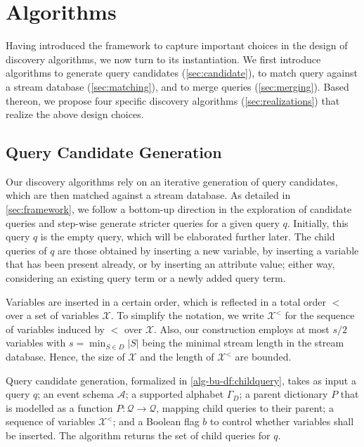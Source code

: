 

\section{\sys{} Algorithms}
\label{sec:algos}
Having introduced the \sys{} framework to capture important choices in the
design of discovery algorithms, we now turn to its instantiation. We
first introduce algorithms to generate query
candidates (\autoref{sec:candidate}), to match query against a stream
database (\autoref{sec:matching}), and to merge queries
(\autoref{sec:merging}). Based thereon, we propose four specific
discovery algorithms (\autoref{sec:realizations}) that realize the above
design choices.

\subsection{Query Candidate Generation}
\label{sec:candidate}



Our discovery algorithms rely on an iterative generation of query candidates,
which are then matched against a stream database. As detailed in
\autoref{sec:framework}, we follow a
bottom-up direction in the exploration of candidate queries and step-wise
generate stricter queries for a given query $q$. Initially, this
query $q$ is the empty
query, which will be elaborated further later.
The child queries of $q$ are those obtained by inserting
a new variable, by inserting a variable that has been present already, or by
inserting an attribute value; either way, considering an existing query term
or a newly added query term.

Variables are inserted in a certain order, which
is reflected in a total order $<$ over a set of variables $\mathcal{X}$. To
simplify the notation, we write $\mathcal{X}^<$ for the sequence of
variables induced by $<$ over $\mathcal{X}$. Also, our
construction employs at most $s/2$ variables with $s=\min_{S\in D} |S|$
being the minimal stream length in the stream database. Hence, the size of
$\mathcal{X}$ and the length of $\mathcal{X}^<$ are bounded.

Query candidate generation, formalized in
\autoref{alg-bu-df:childquery}, takes as input a query $q$; an event
schema $\mathcal{A}$; a supported alphabet $\Gamma_D$; a parent dictionary
$P$ that is modelled as a
function $P: \mathcal{Q} \to \mathcal{Q}$, mapping child queries to their
parent; a sequence of variables $\mathcal{X}^<$; and a Boolean flag $b$ to
control whether variables shall be inserted. The algorithm returns the set
of child queries for $q$.



